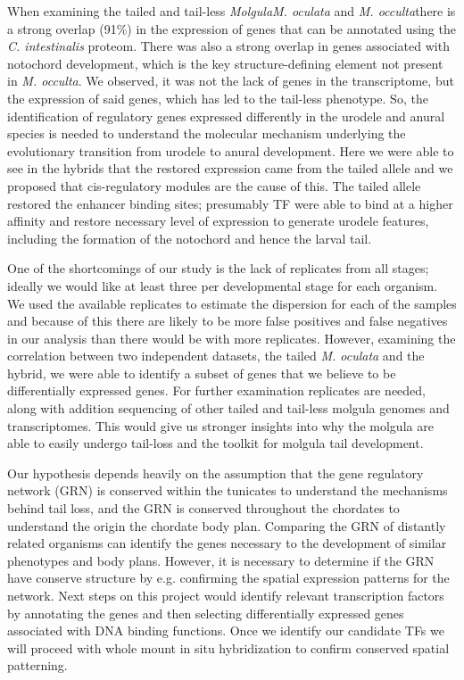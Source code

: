When examining the tailed and tail-less \textit{Molgula}\textemdash \textit{M. oculata} and \textit{M. occulta}\textemdash there is a strong overlap (91\%) in the expression of genes that can be annotated using the \textit{C. intestinalis} proteom. There was also a strong overlap in genes associated with notochord development, which is the key structure-defining element not present in \textit{M. occulta}. We observed, it was not the lack of genes in the transcriptome, but the expression of said genes, which has led to the tail-less phenotype. So, the identification of regulatory genes expressed differently in the urodele and anural species is needed to understand the molecular mechanism underlying the evolutionary transition from urodele to anural development. Here we were able to see in the hybrids that the restored expression came from the tailed allele and we proposed that cis-regulatory modules are the cause of this. The tailed allele restored the enhancer binding sites; presumably TF were able to bind at a higher affinity and restore necessary level of expression to generate urodele features, including the formation of the notochord and hence the larval tail.

One of the shortcomings of our study is the lack of replicates from all stages; ideally we would like at least three per developmental stage for each organism. We used the available replicates to estimate the dispersion for each of the samples and because of this there are likely to be more false positives and false negatives in our analysis than there would be with more replicates. However, examining the correlation between two independent datasets, the tailed \textit{M. oculata} and the hybrid, we were able to identify a subset of genes that we believe to be differentially expressed genes. For further examination replicates are needed, along with addition sequencing of other tailed and tail-less molgula genomes and transcriptomes.  This would give us stronger insights into why the molgula are able to easily undergo tail-loss and the toolkit for molgula tail development. 

Our hypothesis depends heavily on the assumption that the gene regulatory network (GRN) is conserved within the tunicates to understand the mechanisms behind tail loss, and the GRN is conserved throughout the chordates to understand the origin the chordate body plan. Comparing the GRN of distantly related organisms can identify the genes necessary to the development of similar phenotypes and body plans. However, it is necessary to determine if the GRN have conserve structure by e.g. confirming the spatial expression patterns for the network. Next steps on this project would identify relevant transcription factors by annotating the genes and then selecting differentially expressed genes associated with DNA binding functions. Once we identify our candidate TFs we will proceed with whole mount in situ hybridization to confirm conserved spatial patterning.

